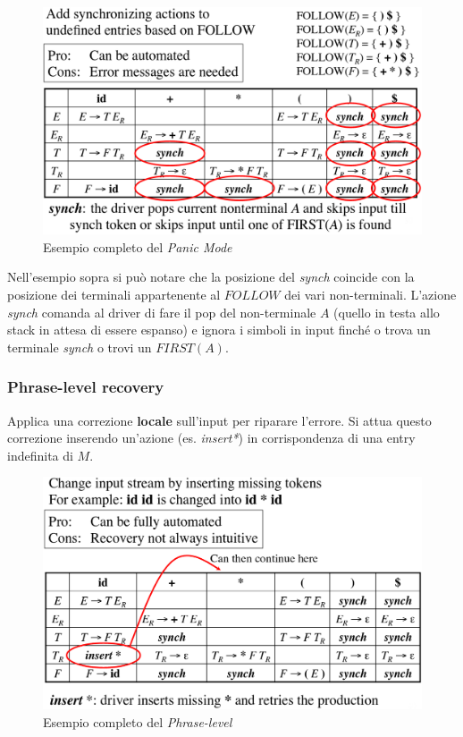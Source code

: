 \begin{figure}[H]
\begin{center}
\includegraphics[scale=0.35]{res/image/example_panic_mode}
\end{center}
\caption{Esempio completo del \textit{Panic Mode}}
\label{img:example_panic_mode}
\end{figure}

Nell'esempio sopra si pu\`o notare che la posizione del \textit{synch} coincide
con la posizione dei terminali appartenente al $FOLLOW$ dei vari non-terminali.
L'azione \textit{synch} comanda al driver di fare il pop del non-terminale $A$
(quello in testa allo stack in attesa di essere espanso) e ignora i simboli in
input finch\'e o trova un terminale \textit{synch} o trovi un $FIRST(A)$.

\subsubsection{Phrase-level recovery}
\label{sec:phrase-level_recovery}
Applica una correzione \textbf{locale} sull'input per riparare l'errore.
Si attua questo correzione inserendo un'azione (es. \textit{insert*}) in
corrispondenza di una entry indefinita di $M$.

\begin{figure}[H]
\begin{center}
\includegraphics[scale=0.35]{res/image/example_phrase_level}
\end{center}
\caption{Esempio completo del \textit{Phrase-level}}
\label{img:example_phrase_level}
\end{figure}

